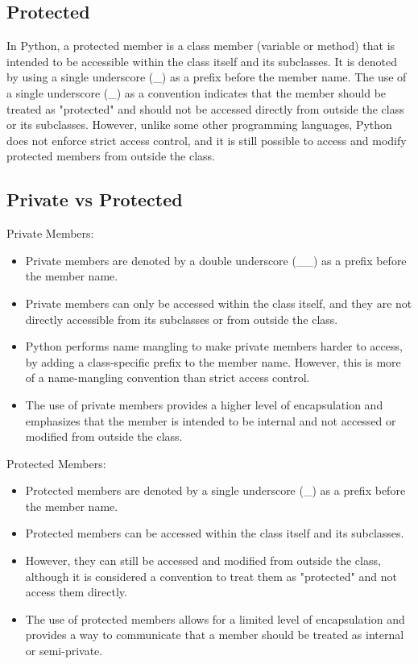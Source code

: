 \documentclass{report}
\begin{document}
    \subsection{Protected}
    \bigbreak \noindent
    In Python, a protected member is a class member (variable or method) that is intended to be accessible within the class itself and its subclasses. It is denoted by using a single underscore (\_) as a prefix before the member name.
    \bigbreak \noindent 
    The use of a single underscore (\_) as a convention indicates that the member should be treated as "protected" and should not be accessed directly from outside the class or its subclasses. However, unlike some other programming languages, Python does not enforce strict access control, and it is still possible to access and modify protected members from outside the class.

    \bigbreak \noindent \bigbreak \noindent 
    \subsection{Private vs Protected}
    \bigbreak \noindent 
    Private Members:
    \begin{itemize}
        \item Private members are denoted by a double underscore (\_\_) as a prefix before the member name.
        \item Private members can only be accessed within the class itself, and they are not directly accessible from its subclasses or from outside the class.
        \item Python performs name mangling to make private members harder to access, by adding a class-specific prefix to the member name. However, this is more of a name-mangling convention than strict access control.
        \item The use of private members provides a higher level of encapsulation and emphasizes that the member is intended to be internal and not accessed or modified from outside the class.
    \end{itemize}

    \bigbreak \noindent 
    Protected Members:
    \begin{itemize}
        \item Protected members are denoted by a single underscore (\_) as a prefix before the member name.
        \item Protected members can be accessed within the class itself and its subclasses.
        \item However, they can still be accessed and modified from outside the class, although it is considered a convention to treat them as "protected" and not access them directly.
        \item The use of protected members allows for a limited level of encapsulation and provides a way to communicate that a member should be treated as internal or semi-private.
    \end{itemize}
\end{document}
